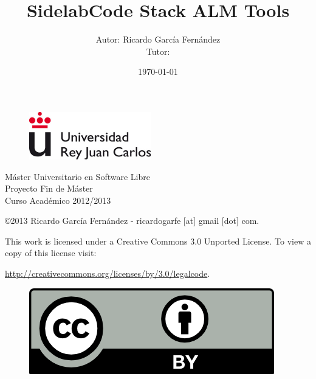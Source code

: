\documentclass[11pt]{scrartcl}
\title{\textbf{SidelabCode Stack ALM Tools}}
\author{Autor: Ricardo Garc\'ia Fern\'andez
\\Tutor: }
\date{\today}
\begin{document}
\maketitle

\vspace{2cm}

\begin{figure}[h]
    \begin{center}
        \includegraphics{urjc}
        \label{fig:urjc}
    \end{center}
\end{figure}

\begin{center}
\large
M\'aster Universitario en Software Libre
\\ Proyecto Fin de M\'aster
\\Curso Acad\'emico 2012/2013
\end{center}

\vfill

\begin{flushright}
    \copyright  2013 Ricardo Garc\'ia Fern\'andez - ricardogarfe [at] gmail [dot] com.

    This work is licensed under a Creative Commons 3.0 Unported License.
    To view a copy of this license visit:
 
    \url{http://creativecommons.org/licenses/by/3.0/legalcode}.
\end{flushright}

\begin{figure}[h]
    \begin{flushright}	
        \includegraphics{by}
        \label{fig:by}
    \end{flushright}
\end{figure}

\newpage

\end{document}
